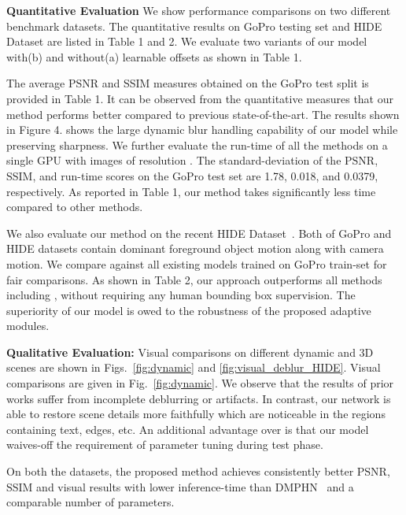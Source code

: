 \documentclass[10pt,twocolumn,letterpaper]{article}
\begin{document}
\textbf{Quantitative Evaluation}
We show performance comparisons on two different benchmark datasets. The quantitative results on GoPro testing set and HIDE Dataset \cite{shen2019human} are listed in Table 1 and 2. We evaluate two variants of our model with(b) and without(a) learnable offsets as shown in Table 1. 


The average PSNR and SSIM measures obtained on the GoPro test split is provided in Table 1. It can be observed from the quantitative measures that our method performs better compared to previous state-of-the-art. The results shown in Figure 4. shows the large dynamic blur handling capability of our model while preserving sharpness.
We further evaluate the run-time of all the methods on a single GPU with images of resolution . The  standard-deviation  of  the PSNR, SSIM, and run-time scores on the GoPro test set are 1.78, 0.018, and 0.0379, respectively. As reported in Table 1, our method takes significantly less time compared to other methods.

We also evaluate our method on the recent HIDE Dataset~\cite{shen2019human}. Both of GoPro and HIDE datasets contain dominant foreground object motion along with camera motion. We compare against all existing models trained on GoPro train-set for fair comparisons. As shown in Table 2, our approach outperforms all methods including \cite{shen2019human}, without requiring any human bounding box supervision. The superiority of our model is owed to the robustness of the proposed adaptive modules.


\textbf{Qualitative Evaluation:}
Visual comparisons on different dynamic and 3D scenes are shown in Figs.~\ref{fig:dynamic} and \ref{fig:visual_deblur_HIDE}.
Visual comparisons  are given in Fig.~\ref{fig:dynamic}. We observe that the results of prior works suffer from incomplete deblurring or artifacts. In contrast, our network is able to restore scene details more faithfully which are noticeable in the regions containing text, edges, etc. An additional advantage over \cite{hyun2013dynamic,whyte2012non} is that our model waives-off the requirement of parameter tuning during test phase.





On both the datasets, the proposed method achieves consistently better PSNR, SSIM and visual results with lower inference-time than DMPHN~\cite{zhang2019deep} and a comparable number of parameters.
\end{document}
